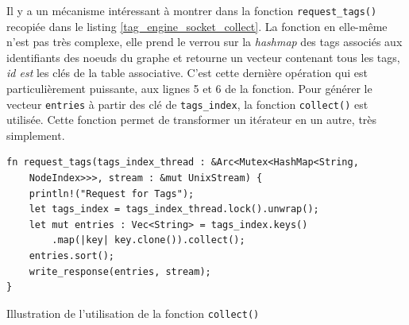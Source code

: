 Il y a un mécanisme intéressant à montrer dans la fonction 
\texttt{request_tags()} recopiée dans le listing \ref{tag_engine_socket_collect}. La 
fonction en elle-même n'est pas très complexe, elle prend le verrou sur la \textit{hashmap} des 
tags associés aux identifiants des noeuds du graphe et retourne un vecteur contenant tous les tags, 
\textit{id est} les clés de la table associative. C'est cette dernière opération qui est 
particulièrement puissante, aux lignes 5 et 6 de la fonction. Pour générer le vecteur 
\texttt{entries} à partir des clé de \texttt{tags_index}, la fonction 
\texttt{collect()} est utilisée. Cette fonction permet de transformer un itérateur en 
un autre, très simplement.
\bigbreak
\begin{code}
    \begin{verbatim}
fn request_tags(tags_index_thread : &Arc<Mutex<HashMap<String, 
    NodeIndex>>>, stream : &mut UnixStream) {
    println!("Request for Tags");
    let tags_index = tags_index_thread.lock().unwrap();
    let mut entries : Vec<String> = tags_index.keys()
        .map(|key| key.clone()).collect();
    entries.sort();
    write_response(entries, stream);
}
    \end{verbatim}
    \caption{Illustration de l'utilisation de la fonction \texttt{collect()}}
    \label{tag_engine_socket_collect}
\end{code}
\bigbreak

